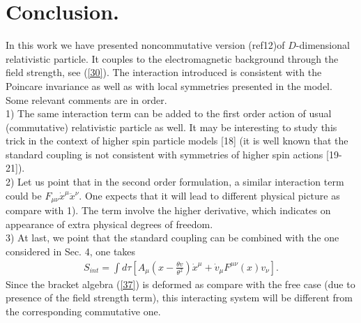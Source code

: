 \documentclass[paper a4]{article}
\begin{document}
\section{Conclusion.}

In this work we have presented noncommutative version (ref{12})of
$D$-dimensional relativistic particle. It couples to the electromagnetic
background through the field strength, see (\ref{30}). The interaction
introduced is consistent with the Poincare invariance as well as with
local symmetries presented in the model. Some relevant
comments are in order. \\
1) The same interaction term can be added to the first order action of
usual (commutative) relativistic particle as well. It may be interesting
to study this trick in the context of higher spin particle models [18]
(it is well known that the standard coupling is not consistent with
symmetries of higher spin actions [19-21]). \\
2) Let us point that in the second order formulation, a similar
interaction term could be $F_{\mu\nu}\dot x^\mu\ddot x^\nu$. One expects
that it will lead to different physical picture as compare with 1).
The term involve the higher derivative, which indicates on appearance
of extra physical degrees of freedom. \\
3) At last, we point that the standard coupling can be combined with
the one considered in Sec. 4, one takes
\begin{eqnarray}\label{39}
S_{int}=\int d\tau\left[A_\mu\left(x-\frac{\theta v}{\theta^2}\right)
\dot x^\mu+\dot v_\mu F^{\mu\nu}(x)v_\nu\right].
\end{eqnarray}
Since the bracket algebra (\ref{37}) is deformed
as compare with the free case (due to presence of
the field strength term), this interacting
system will be different from the corresponding commutative one.
\end{document}
